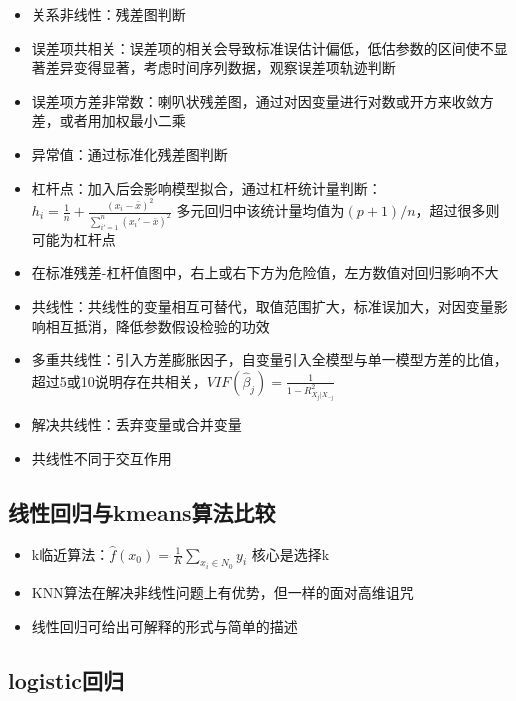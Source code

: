 \documentclass[]{book}
\providecommand{\tightlist}{%
  \setlength{\itemsep}{0pt}\setlength{\parskip}{0pt}}
\begin{document}
\begin{itemize}
\tightlist
\item
  关系非线性：残差图判断
\item
  误差项共相关：误差项的相关会导致标准误估计偏低，低估参数的区间使不显著差异变得显著，考虑时间序列数据，观察误差项轨迹判断
\item
  误差项方差非常数：喇叭状残差图，通过对因变量进行对数或开方来收敛方差，或者用加权最小二乘
\item
  异常值：通过标准化残差图判断
\item
  杠杆点：加入后会影响模型拟合，通过杠杆统计量判断： \(h_i = \frac{1}{n} + \frac{(x_i - \bar x)^2}{\sum_{i' = 1}^{n} (x_i' - \bar x)^2}\) 多元回归中该统计量均值为\((p+1)/n\)，超过很多则可能为杠杆点
\item
  在标准残差-杠杆值图中，右上或右下方为危险值，左方数值对回归影响不大
\item
  共线性：共线性的变量相互可替代，取值范围扩大，标准误加大，对因变量影响相互抵消，降低参数假设检验的功效
\item
  多重共线性：引入方差膨胀因子，自变量引入全模型与单一模型方差的比值，超过5或10说明存在共相关，\(VIF(\hat \beta_j) = \frac{1}{1 - R^2_{X_j|X_{-j}}}\)
\item
  解决共线性：丢弃变量或合并变量
\item
  共线性不同于交互作用
\end{itemize}

\hypertarget{kmeans}{%
\subsection{线性回归与kmeans算法比较}\label{kmeans}}

\begin{itemize}
\tightlist
\item
  k临近算法：\(\hat f(x_0) = \frac{1}{K} \sum_{x_i \in N_0} y_i\) 核心是选择k
\item
  KNN算法在解决非线性问题上有优势，但一样的面对高维诅咒
\item
  线性回归可给出可解释的形式与简单的描述
\end{itemize}

\hypertarget{logistic}{%
\subsection{logistic回归}\label{logistic}}
\end{document}
